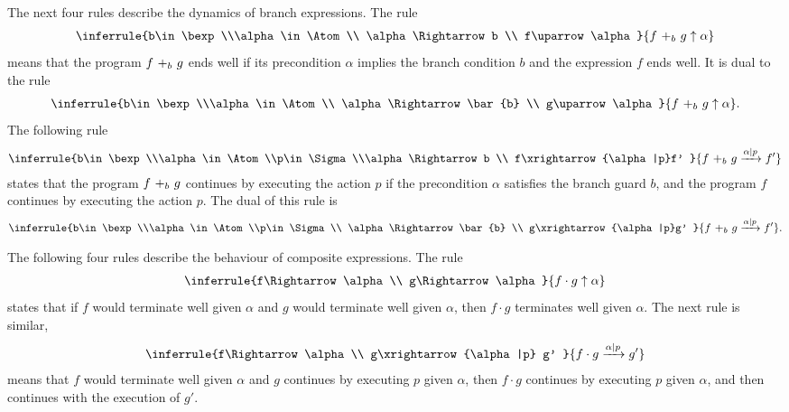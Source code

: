 The next four rules describe the dynamics of branch expressions. The rule
\begin{align*}
    \inferrule
    {b\in \bexp\\\alpha\in \Atom \\ \alpha \Rightarrow b \\ f\uparrow \alpha }
    {\branch{b}{f}{g}\uparrow \alpha}    
\end{align*}
means that the program $\branch{b}{f}{g}$ ends well if its precondition $\alpha$ implies the branch condition $b$ and the expression $f$ ends well. It is dual to the rule
\begin{align*}
    \inferrule
    {b\in \bexp\\\alpha\in \Atom \\ \alpha \Rightarrow \bar{b} \\ g\uparrow \alpha }
    {\branch{b}{f}{g}\uparrow \alpha}.    
\end{align*}
The following rule
\begin{align*}
    \inferrule
    {b\in \bexp\\\alpha\in \Atom \\p\in \Sigma \\\alpha \Rightarrow b \\ f\xrightarrow{\alpha|p}f' }
    {\branch{b}{f}{g}\xrightarrow{\alpha|p} f'}
\end{align*}
states that the program $\branch{b}{f}{g}$ continues by executing the action $p$ if the precondition $\alpha$ satisfies the branch guard $b$, and the program $f$ continues by executing the action $p$. The dual of this rule is 
\begin{align*}
    \inferrule
    {b\in \bexp\\\alpha\in \Atom \\p\in \Sigma\\ \alpha \Rightarrow \bar{b} \\ g\xrightarrow{\alpha|p}g' }
    {\branch{b}{f}{g}\xrightarrow{\alpha|p} f'}.    
\end{align*}

The following four rules describe the behaviour of composite expressions. The rule
\begin{align*}
    \inferrule
    {f\Rightarrow \alpha\\ g\Rightarrow \alpha }
    {f\cdot g\uparrow \alpha}    
\end{align*}
states that if $f$ would terminate well given $\alpha$ and $g$ would terminate well given $\alpha$, then $f\cdot g$ terminates well given $\alpha$. The next rule is similar, 
\begin{align*}
    \inferrule
    {f\Rightarrow \alpha\\ g\xrightarrow{\alpha|p} g' }
    {f\cdot g\xrightarrow{\alpha|p} g'}    
\end{align*}
means that $f$ would terminate well given $\alpha$ and $g$ continues by executing $p$ given $\alpha$, then $f\cdot g$ continues by executing $p$ given $\alpha$, and then continues with the execution of $g'$.

